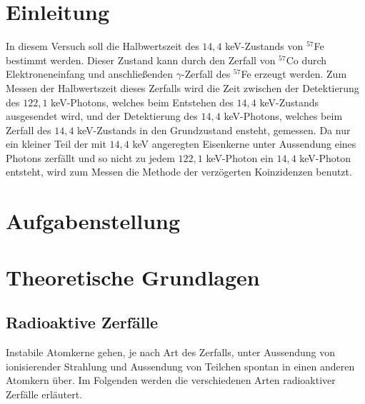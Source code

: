 \documentclass[12pt]{article}
\title{\vspace{0cm}{\Huge Fortgeschrittenen-Praktikum I:\\ \vspace{1cm} Kurze Halbwertszeiten}}
\author{Saskia Bondza\\Simon Stephan}
\date{Durchgeführt am 02.09.2016 und 05.09.2016}
\begin{document}
\maketitle
\newpage

\thispagestyle{empty}
\tableofcontents
\newpage

\section{Einleitung}


In diesem Versuch soll die Halbwertszeit des $14,4$ keV-Zustands von $^{57}$Fe bestimmt werden. Dieser Zustand kann durch den Zerfall von $^{57}$Co durch Elektroneneinfang und anschließenden $\gamma$-Zerfall des $^{57}$Fe erzeugt werden. Zum Messen der Halbwertszeit dieses Zerfalls wird die Zeit zwischen der Detektierung des $122,1$ keV-Photons, welches beim Entstehen des $14,4$ keV-Zustands ausgesendet wird, und der Detektierung des $14,4$ keV-Photons, welches beim Zerfall des $14,4$ keV-Zustands in den Grundzustand ensteht, gemessen. Da nur ein kleiner Teil der mit $14,4$ keV angeregten Eisenkerne unter Aussendung eines Photons zerfällt und so nicht zu jedem $122,1$ keV-Photon ein $14,4$ keV-Photon entsteht, wird zum Messen die Methode der verzögerten Koinzidenzen benutzt.




\newpage
\section[Aufgabenstellung]{Aufgabenstellung}%






\newpage
\section{Theoretische Grundlagen}
\subsection{Radioaktive Zerfälle}
Instabile Atomkerne gehen, je nach Art des Zerfalls, unter Aussendung von ionisierender Strahlung und Aussendung von Teilchen spontan in einen anderen Atomkern über. Im Folgenden werden die verschiedenen Arten radioaktiver Zerfälle erläutert.
\end{document}
